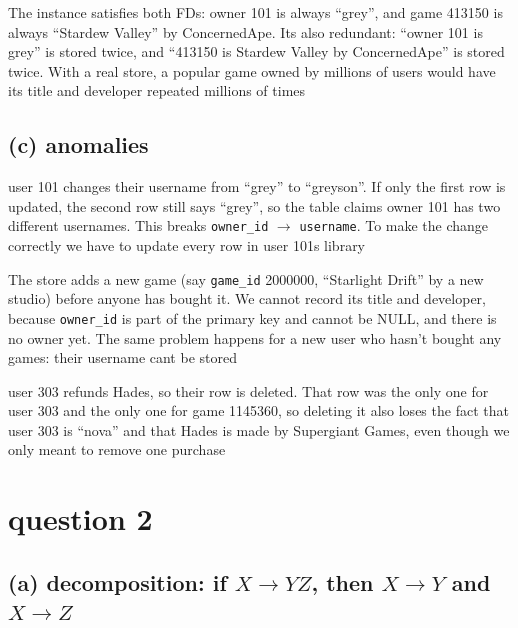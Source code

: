 \documentclass[11pt]{article}
\newcommand{\at}[1]{\texttt{#1}}
\begin{document}
\noindent The instance satisfies both FDs: owner 101 is always ``grey'', and
game 413150 is always ``Stardew Valley'' by ConcernedApe. Its also
redundant: ``owner 101 is grey'' is stored twice, and ``413150 is Stardew
Valley by ConcernedApe'' is stored twice. With a real store, a popular game
owned by millions of users would have its title and developer repeated
millions of times

\subsection*{(c) anomalies}

\begin{description}[leftmargin=1em]
  \item[update anomaly] user 101 changes their username from ``grey'' to
    ``greyson''. If only the first row is updated, the second row still says
    ``grey'', so the table claims owner 101 has two different usernames. This
    breaks \at{owner\_id} $\to$ \at{username}. To make the change correctly we
    have to update every row in user 101s library

  \item[insertion anomaly] The store adds a new game (say \at{game\_id}
    2000000, ``Starlight Drift'' by a new studio) before anyone has bought it.
    We cannot record its title and developer, because \at{owner\_id} is part
    of the primary key and cannot be NULL, and there is no owner yet. The same
    problem happens for a new user who hasn't bought any games: their
    username cant be stored

  \item[deletion anomaly] user 303 refunds Hades, so their row is deleted.
    That row was the only one for user 303 and the only one for game
    1145360, so deleting it also loses the fact that user 303 is ``nova''
    and that Hades is made by Supergiant Games, even though we only meant to
    remove one purchase
\end{description}

\section*{question 2}

\subsection*{(a) decomposition: if $X \to YZ$, then $X \to Y$ and $X \to Z$}
\end{document}

